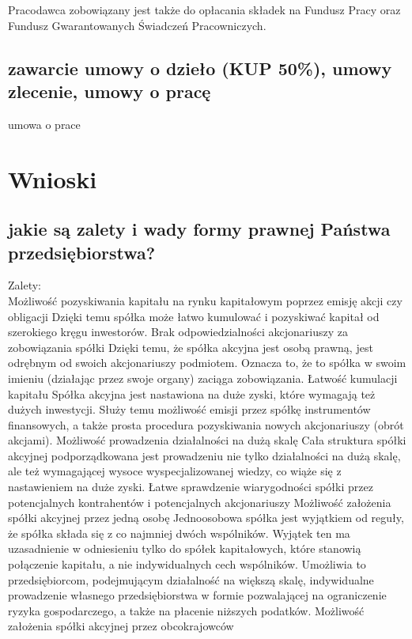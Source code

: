\documentclass[a4paper, 11pt]{article}
\begin{document}
Pracodawca zobowiązany jest także do opłacania składek na Fundusz Pracy oraz Fundusz Gwarantowanych Świadczeń Pracowniczych.

\subsection{zawarcie umowy o dzieło (KUP 50\%), umowy zlecenie, umowy o pracę}
umowa o prace
\section{Wnioski}
 
\subsection{jakie są zalety i wady formy prawnej Państwa przedsiębiorstwa?}
Zalety:\\
Możliwość pozyskiwania kapitału na rynku kapitałowym poprzez emisję akcji czy obligacji 
Dzięki temu spółka może łatwo kumulować i pozyskiwać kapitał od szerokiego kręgu inwestorów.
Brak odpowiedzialności akcjonariuszy za zobowiązania spółki
Dzięki temu, że spółka akcyjna jest osobą prawną, jest odrębnym od swoich akcjonariuszy podmiotem. Oznacza to, że to spółka w swoim imieniu (działając przez swoje organy) zaciąga zobowiązania.
Łatwość kumulacji kapitału
Spółka akcyjna jest nastawiona na duże zyski, które wymagają też dużych inwestycji. Służy temu możliwość emisji przez spółkę instrumentów finansowych, a także prosta procedura pozyskiwania nowych akcjonariuszy (obrót akcjami). 
Możliwość prowadzenia działalności na dużą skalę
Cała struktura spółki akcyjnej podporządkowana jest prowadzeniu nie tylko działalności na dużą skalę, ale też wymagającej wysoce wyspecjalizowanej wiedzy, co wiąże się z nastawieniem na duże zyski.
Łatwe sprawdzenie wiarygodności spółki przez potencjalnych 			kontrahentów i potencjalnych akcjonariuszy
Możliwość założenia spółki akcyjnej przez jedną osobę
Jednoosobowa spółka jest wyjątkiem od reguły, że spółka składa się z co najmniej dwóch wspólników. Wyjątek ten ma uzasadnienie w odniesieniu tylko do spółek kapitałowych, które stanowią połączenie kapitału, a nie indywidualnych cech wspólników. Umożliwia to  przedsiębiorcom, podejmującym działalność na większą skalę, indywidualne prowadzenie własnego przedsiębiorstwa w formie pozwalającej na ograniczenie ryzyka gospodarczego, a także na płacenie niższych podatków.
Możliwość założenia spółki akcyjnej przez obcokrajowców
\end{document}
